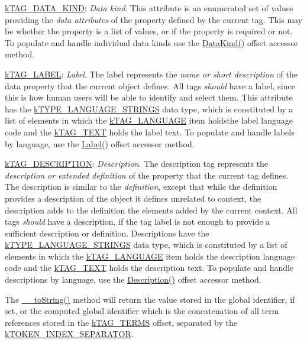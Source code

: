 \begin{DoxyItemize}
\item {\ttfamily \hyperlink{}{k\-T\-A\-G\-\_\-\-D\-A\-T\-A\-\_\-\-K\-I\-N\-D}}\-: {\itshape Data kind}. This attribute is an enumerated set of values providing the {\itshape data attributes} of the property defined by the current tag. This may be whether the property is a list of values, or if the property is required or not. To populate and handle individual data kinds use the \hyperlink{}{Data\-Kind()} offset accessor method. 
\item {\ttfamily \hyperlink{}{k\-T\-A\-G\-\_\-\-L\-A\-B\-E\-L}}\-: {\itshape Label}. The label represents the {\itshape name or short description} of the data property that the current object defines. All tags {\itshape should} have a label, since this is how human users will be able to identify and select them. This attribute has the \hyperlink{}{k\-T\-Y\-P\-E\-\_\-\-L\-A\-N\-G\-U\-A\-G\-E\-\_\-\-S\-T\-R\-I\-N\-G\-S} data type, which is constituted by a list of elements in which the \hyperlink{}{k\-T\-A\-G\-\_\-\-L\-A\-N\-G\-U\-A\-G\-E} item holdsthe label language code and the \hyperlink{}{k\-T\-A\-G\-\_\-\-T\-E\-X\-T} holds the label text. To populate and handle labels by language, use the \hyperlink{}{Label()} offset accessor method. 
\item {\ttfamily \hyperlink{}{k\-T\-A\-G\-\_\-\-D\-E\-S\-C\-R\-I\-P\-T\-I\-O\-N}}\-: {\itshape Description}. The description tag represents the {\itshape description or extended definition} of the property that the current tag defines. The description is similar to the {\itshape definition}, except that while the definition provides a description of the object it defines unrelated to context, the description adds to the definition the elements added by the current context. All tags {\itshape should} have a description, if the tag label is not enough to provide a sufficient description or definition. Descriptions have the \hyperlink{}{k\-T\-Y\-P\-E\-\_\-\-L\-A\-N\-G\-U\-A\-G\-E\-\_\-\-S\-T\-R\-I\-N\-G\-S} data type, which is constituted by a list of elements in which the \hyperlink{}{k\-T\-A\-G\-\_\-\-L\-A\-N\-G\-U\-A\-G\-E} item holds the description language code and the \hyperlink{}{k\-T\-A\-G\-\_\-\-T\-E\-X\-T} holds the description text. To populate and handle descriptions by language, use the \hyperlink{}{Description()} offset accessor method. 
\end{DoxyItemize}

The \hyperlink{class_ontology_wrapper_1_1_tag_a38eb887959321b660131324966f16193}{\-\_\-\-\_\-to\-String()} method will return the value stored in the global identifier, if set, or the computed global identifier which is the concatenation of all term references stored in the \hyperlink{}{k\-T\-A\-G\-\_\-\-T\-E\-R\-M\-S} offset, separated by the \hyperlink{}{k\-T\-O\-K\-E\-N\-\_\-\-I\-N\-D\-E\-X\-\_\-\-S\-E\-P\-A\-R\-A\-T\-O\-R}.


